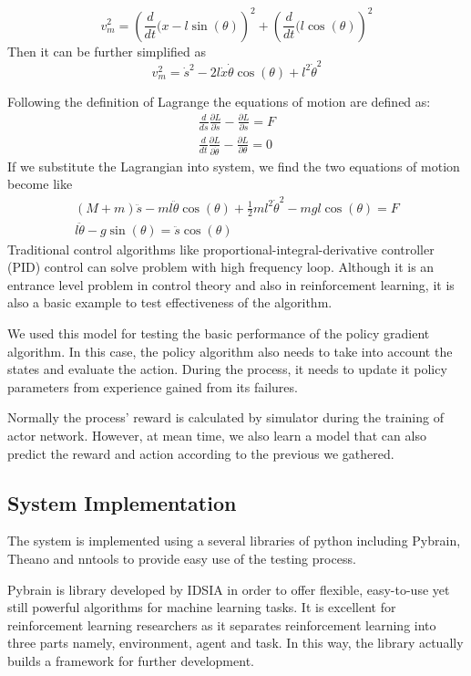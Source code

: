 \documentclass[officiallayout]{tktla}
\begin{document}
\begin{equation}
v_m^2=\left(	\frac{d}{dt}(x - l\sin(\theta) \right)^2 + \left(\frac{d}{dt}(l\cos(\theta)\right)^2
\end{equation}
Then it can be further simplified as 	
\begin{equation}
v_m^2=\dot{s}^2-2l\dot{x}\dot{\theta} \cos(\theta) + l^2\dot{\theta}^2
\end{equation}

Following the definition of Lagrange the equations of motion are defined as:
\begin{align}
\frac{d}{ds}\frac{\partial L}{\partial \dot{s}} - \frac{\partial L}{\partial s} = F \\
\frac{d}{dt}\frac{\partial L}{\partial \dot{\theta}} - \frac{\partial L}{\partial \theta} = 0
\end{align}
If we substitute the Lagrangian into system, we find the two equations of motion become like 
\begin{align}
(M + m)\ddot{s} - 	ml\ddot{\theta} \cos(\theta) + \frac{1}{2}ml^2\dot{\theta}^2 - mgl\cos(\theta) = F \\
l\ddot{\theta} - g\sin(\theta) = \ddot{s} \cos(\theta)
\end{align}
Traditional control algorithms like proportional-integral-derivative controller (PID) control can solve problem with high frequency loop. Although it is an entrance level problem in control theory and also in reinforcement learning, it is also a basic example to test effectiveness of the algorithm.

We used this model for testing the basic performance of the policy gradient algorithm. In this case, the policy algorithm also needs to take into account the states and evaluate the action. During the process, it needs to update it policy parameters from experience gained from its failures.

Normally the process' reward is calculated by simulator during the training of actor network. However, at mean time, we also learn a model that can also predict the reward and action according to the previous we gathered.
\subsection{System Implementation}

The system is implemented using a several libraries of python including Pybrain, Theano and nntools to provide easy use of the testing process. 

Pybrain is library developed by IDSIA \cite{pybrain2010jmlr} in order to offer flexible, easy-to-use yet still powerful algorithms for machine learning tasks. It is excellent for reinforcement learning researchers as it separates reinforcement learning into three parts namely, environment, agent and task. In this way, the library actually builds a framework for further development.
\end{document}
